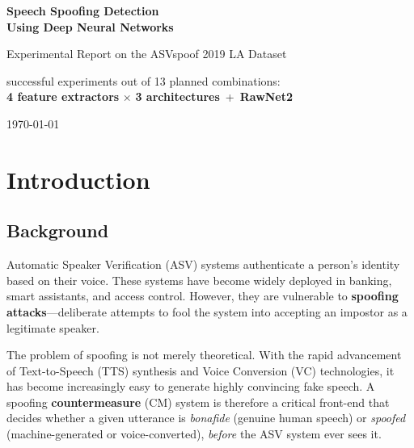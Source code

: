 \documentclass[12pt]{report}
\begin{document}
\begin{titlepage}
    \centering
    \vspace*{3cm}
    {\Huge\bfseries Speech Spoofing Detection\\[0.5em]
    Using Deep Neural Networks\par}
    \vspace{1.5cm}
    {\Large Experimental Report on the ASVspoof 2019 LA Dataset\par}
    \vspace{2cm}
    \begin{tcolorbox}[
        enhanced,
        colback=amzchaptercolor!10!white,
        colframe=amzchaptercolor,
        boxrule=1pt,
        width=0.8\textwidth,
        center,
    ]
     successful experiments out of 13 planned combinations:\\
    \textbf{4 feature extractors} $\times$ \textbf{3 architectures}
    \,+\, \textbf{RawNet2}
    \end{tcolorbox}
    \vfill
    {\large \today\par}
\end{titlepage}

\tableofcontents
\newpage

\chapter{Introduction}

\section{Background}

Automatic Speaker Verification (ASV) systems authenticate a person's identity based on their voice.
These systems have become widely deployed in banking, smart assistants, and access control.
However, they are vulnerable to \textbf{spoofing attacks}---deliberate attempts to fool the system
into accepting an impostor as a legitimate speaker.

The problem of spoofing is not merely theoretical.
With the rapid advancement of Text-to-Speech (TTS) synthesis and Voice Conversion (VC) technologies,
it has become increasingly easy to generate highly convincing fake speech.
A spoofing \textbf{countermeasure} (CM) system is therefore a critical front-end that decides whether
a given utterance is \emph{bonafide} (genuine human speech) or \emph{spoofed} (machine-generated or
voice-converted), \emph{before} the ASV system ever sees it.
\end{document}
